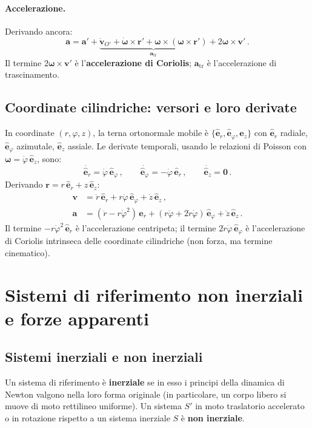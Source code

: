 \documentclass[11pt,a4paper]{article}
\renewcommand{\vec}[1]{\bm{#1}}
\newcommand{\er}{\hat{\bm{e}}_r}
\newcommand{\ephi}{\hat{\bm{e}}_\varphi}
\newcommand{\ez}{\hat{\bm{e}}_z}
\newcommand{\om}{\vec{\omega}}
\theoremstyle{plain}
\theoremstyle{definition}
\theoremstyle{remark}
\begin{document}
\paragraph{Accelerazione.}
Derivando ancora:
\[
  \vec{a}=\vec{a}'+\underbrace{\dot{\vec{v}}_{O'}
          +\dot{\om}\times\vec{r}'+\om\times(\om\times\vec{r}')}_{\vec{a}_\mathrm{tr}}
          +2\om\times\vec{v}'\,.
\]
Il termine $2\om\times\vec{v}'$ è l'\textbf{accelerazione di Coriolis};
$\vec{a}_\mathrm{tr}$ è l'accelerazione di trascinamento.

\subsection{Coordinate cilindriche: versori e loro derivate}

In coordinate $(r,\varphi,z)$, la terna ortonormale mobile è $\{\er,\ephi,\ez\}$
con $\er$ radiale, $\ephi$ azimutale, $\ez$ assiale. Le derivate temporali,
usando le relazioni di Poisson con $\om=\dot\varphi\,\ez$, sono:
\[
  \dot{\er}=\dot\varphi\,\ephi\,,\qquad
  \dot{\ephi}=-\dot\varphi\,\er\,,\qquad
  \dot{\ez}=\vec{0}\,.
\]
Derivando $\vec{r}=r\,\er+z\,\ez$:
\begin{align*}
  \vec{v}&=\dot r\,\er + r\dot\varphi\,\ephi + \dot z\,\ez\,,\\
  \vec{a}&=(\ddot r-r\dot\varphi^2)\,\er+(r\ddot\varphi+2\dot r\dot\varphi)\,\ephi+\ddot z\,\ez\,.
\end{align*}
Il termine $-r\dot\varphi^2\,\er$ è l'accelerazione centripeta; il termine
$2\dot r\dot\varphi\,\ephi$ è l'accelerazione di Coriolis intrinseca delle
coordinate cilindriche (non forza, ma termine cinematico).

\section{Sistemi di riferimento non inerziali e forze apparenti}

\subsection{Sistemi inerziali e non inerziali}

Un sistema di riferimento è \textbf{inerziale} se in esso i principi della
dinamica di Newton valgono nella loro forma originale (in particolare, un
corpo libero si muove di moto rettilineo uniforme). Un sistema $S'$ in moto
traslatorio accelerato o in rotazione rispetto a un sistema inerziale $S$ è
\textbf{non inerziale}.
\end{document}
